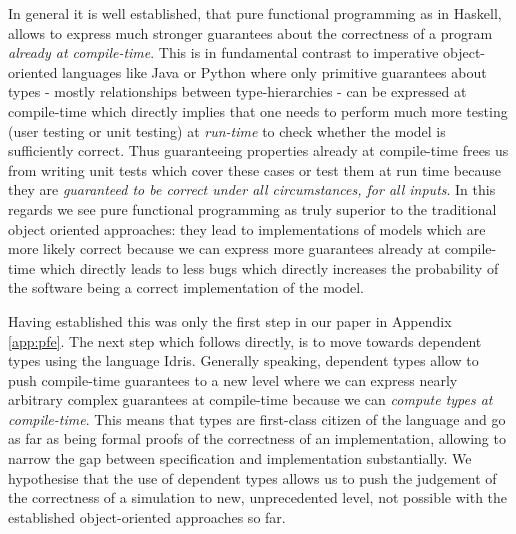 In general it is well established, that pure functional programming as in Haskell, allows to express much stronger guarantees about the correctness of a program \textit{already at compile-time}. This is in fundamental contrast to imperative object-oriented languages like Java or Python where only primitive guarantees about types - mostly relationships between type-hierarchies - can be expressed at compile-time which directly implies that one needs to perform much more testing (user testing or unit testing) at \textit{run-time} to check whether the model is sufficiently correct. Thus guaranteeing properties already at compile-time frees us from writing unit tests which cover these cases or test them at run time because they are \textit{guaranteed to be correct under all circumstances, for all inputs}. In this regards we see pure functional programming as truly superior to the traditional object oriented approaches: they lead to implementations of models which are more likely correct because we can express more guarantees already at compile-time which directly leads to less bugs which directly increases the probability of the software being a correct implementation of the model.

Having established this was only the first step in our paper in Appendix \ref{app:pfe}. The next step which follows directly, is to move towards dependent types using the language Idris. Generally speaking, dependent types allow to push compile-time guarantees to a new level where we can express nearly arbitrary complex guarantees at compile-time because we can \textit{compute types at compile-time}. This means that types are first-class citizen of the language and go as far as being formal proofs of the correctness of an implementation, allowing to narrow the gap between specification and implementation substantially. We hypothesise that the use of dependent types allows us to push the judgement of the correctness of a simulation to new, unprecedented level, not possible with the established object-oriented approaches so far.

